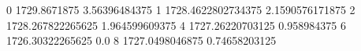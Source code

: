 0 1729.8671875 3.56396484375
1 1728.4622802734375 2.1590576171875
2 1728.267822265625 1.964599609375
4 1727.26220703125 0.958984375
6 1726.30322265625 0.0
8 1727.0498046875 0.74658203125
